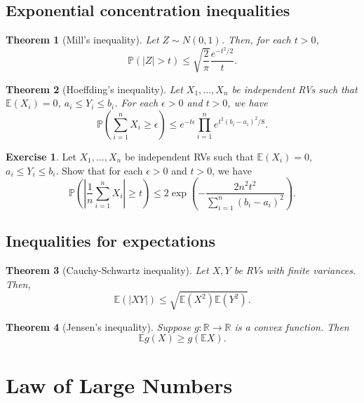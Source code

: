 \documentclass[
  openany]{book}
\newtheorem{theorem}{Theorem}[chapter]
\theoremstyle{definition}
\theoremstyle{definition}
\theoremstyle{definition}
\newtheorem{exercise}{Exercise}[chapter]
\theoremstyle{definition}
\theoremstyle{remark}
\begin{document}
\subsection{Exponential concentration inequalities}\label{exponential-concentration-inequalities}

\begin{theorem}[Mill's inequality]
Let \(Z \sim N(0,1)\). Then,
for each \(t >0\),
\[ \mathbb{P}(|Z| > t) \leq \sqrt{\frac{2}{\pi}} \frac{e^{-t^2/2}}{t}. \]
\end{theorem}

\begin{theorem}[Hoeffding's inequality]
Let \(X_1, \dots, X_n\) be independent RVs such that
\(\mathbb{E}( X_i ) = 0\), \(a_i \leq Y_i \leq b_i\).
For each \(\epsilon >0\) and \(t>0\), we have
\[ \mathbb{P}\left(  \sum_{i=1}^n X_i \geq \epsilon \right) 
\leq e^{-t\epsilon} \prod_{i=1}^n e^{t^2(b_i - a_i)^2/8}. \]
\end{theorem}

\begin{exercise}
\protect\hypertarget{exr:Hoeffding}{}\label{exr:Hoeffding}Let \(X_1, \dots, X_n\) be independent RVs such that
\(\mathbb{E}( X_i ) = 0\), \(a_i \leq Y_i \leq b_i\).
Show that
for each \(\epsilon >0\) and \(t>0\), we have
\[ \mathbb{P}\left( \left| \frac{1}{n}\sum_{i=1}^n X_i \right| \geq t \right) 
\leq 2  \exp\left( - \frac{2 n^2 t^2}{\sum_{i=1}^n (b_i - a_i)^2}   \right). \]
\end{exercise}

\subsection{Inequalities for expectations}\label{inequalities-for-expectations}

\begin{theorem}[Cauchy-Schwartz inequality]
Let \(X, Y\) be RVs with finite variances. Then,
\[\mathbb{E}( |XY| ) \leq \sqrt{ \mathbb{E}(X^2) \mathbb{E}(Y^2) }.\]
\end{theorem}

\begin{theorem}[Jensen's inequality]
Suppose \(g:\mathbb{R}\to \mathbb{R}\) is a convex function.
Then
\[ \mathbb{E}g(X) \geq g(\mathbb{E}X). \]
\end{theorem}

\section{Law of Large Numbers}\label{law-of-large-numbers}
\end{document}
